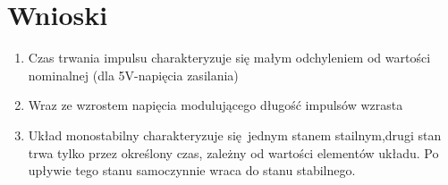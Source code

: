 \documentclass[a4paper,12pt]{article}
\begin{document}
\section {Wnioski}
\begin{enumerate}  
\item Czas trwania impulsu charakteryzuje się małym odchyleniem od wartości nominalnej (dla 5V-napięcia zasilania)
\item Wraz ze wzrostem napięcia modulującego długość impulsów wzrasta
\item Układ monostabilny charakteryzuje się jednym stanem stailnym,drugi stan trwa tylko przez określony czas, zależny od wartości elementów układu. Po upływie tego stanu samoczynnie  wraca  do  stanu  stabilnego.
\end{enumerate}
\end{document}
